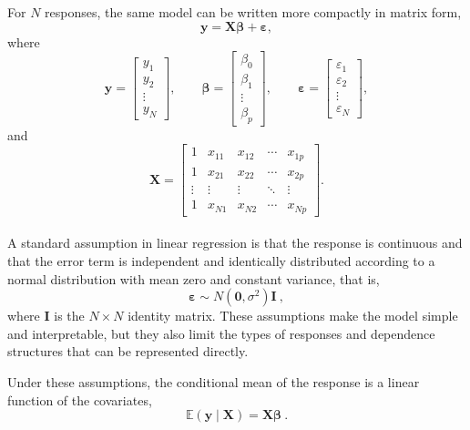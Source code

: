 For $N$ responses, the same model can be written more compactly in matrix form,
%
\begin{equation}
\mathbf{y} = \mathbf{X}\boldsymbol{\beta} + \boldsymbol{\varepsilon},
\end{equation}
%
where
\[
\mathbf{y} =
\begin{bmatrix}
y_1 \\
y_2 \\
\vdots \\
y_N
\end{bmatrix},
\qquad
\boldsymbol{\beta} =
\begin{bmatrix}
\beta_0 \\
\beta_1 \\
\vdots \\
\beta_p
\end{bmatrix},
\qquad
\boldsymbol{\varepsilon} =
\begin{bmatrix}
\varepsilon_1 \\
\varepsilon_2 \\
\vdots \\
\varepsilon_N
\end{bmatrix},
\]
and
\[
\mathbf{X} =
\begin{bmatrix}
1 & x_{11} & x_{12} & \cdots & x_{1p} \\
1 & x_{21} & x_{22} & \cdots & x_{2p} \\
\vdots & \vdots & \vdots & \ddots & \vdots \\
1 & x_{N1} & x_{N2} & \cdots & x_{Np}
\end{bmatrix}.
\]
\\

A standard assumption in linear regression is that the response is continuous and that the error term is independent and identically distributed according to a normal distribution with mean zero and constant variance, that is,
%
\begin{equation}
\boldsymbol{\varepsilon} \sim N(\boldsymbol{0},\sigma^2)\boldsymbol{I} \ ,
\end{equation}
%
where $\boldsymbol{I}$ is the $N\times N$ identity matrix.
These assumptions make the model simple and interpretable, but they also limit the types of responses and dependence structures that can be represented directly.

Under these assumptions, the conditional mean of the response is a linear function of the covariates,
%
\begin{equation}
\mathbb{E}(\mathbf{y}\mid\mathbf{X}) = \mathbf{X}\boldsymbol{\beta} \ .
\end{equation}



